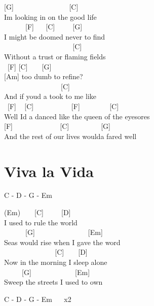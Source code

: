\documentclass[
  letterpaper,
  twoside=false]{scrbook}
\begin{document}
{[}G{]} ~ ~ ~ ~ ~ ~ ~ ~ ~ {[}C{]}\\
I\textquotesingle m looking in on the good life\\
\hspace*{0.333em} ~ ~ ~ ~{[}F{]} ~ ~{[}C{]} ~ ~ ~{[}G{]}\\
I might be doomed never to find\\
\hspace*{0.333em} ~ ~ ~ ~ ~ ~ ~ ~ ~ ~ ~ ~{[}C{]}\\
Without a trust or flaming fields\\
\hspace*{0.333em} ~{[}F{]} {[}C{]} ~ ~ {[}G{]}\\
{[}Am{]} too dumb to refine?\\
\hspace*{0.333em} ~ ~ ~ ~ ~ ~ ~ ~ ~ ~{[}C{]}\\
And if you\textquotesingle d a took to me like\\
\hspace*{0.333em} ~{[}F{]} ~ {[}C{]} ~ ~ ~ ~ ~ ~ {[}F{]} ~ ~ ~ ~
~{[}C{]}\\
Well I\textquotesingle d a danced like the queen of the eyesores\\
{[}F{]} ~ ~ ~ ~ ~ ~ ~ ~{[}C{]} ~ ~ ~ ~ ~ {[}G{]}\\
And the rest of our lives would\textquotesingle a fared well

\hypertarget{viva-la-vida}{%
\chapter{Viva la Vida}\label{viva-la-vida}}

C - D - G - Em

(Em) ~ ~ {[}C{]} ~ ~ ~{[}D{]}\\
I used to rule the world\\
\hspace*{0.333em} ~ ~ ~ ~{[}G{]} ~ ~ ~ ~ ~ ~ ~ ~ ~{[}Em{]}\\
Seas would rise when I gave the word\\
\hspace*{0.333em} ~ ~ ~ ~ ~ ~ ~ ~ ~{[}C{]} ~ ~ {[}D{]}\\
Now in the morning I sleep alone\\
\hspace*{0.333em} ~ ~ ~ {[}G{]} ~ ~ ~ ~ ~ ~ ~ {[}Em{]}\\
Sweep the streets I used to own

C - D - G - Em ~ ~x2
\end{document}
